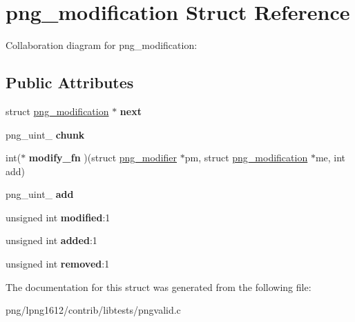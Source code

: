 \hypertarget{structpng__modification}{\section{png\+\_\+modification Struct Reference}
\label{structpng__modification}
}


Collaboration diagram for png\+\_\+modification\+:
\subsection*{Public Attributes}
\begin{DoxyCompactItemize}
\item 
\hypertarget{structpng__modification_ac0a124aec5b95e2fe45bd06455ddaec8}{struct \hyperlink{structpng__modification}{png\+\_\+modification} $\ast$ {\bfseries next}}\label{structpng__modification_ac0a124aec5b95e2fe45bd06455ddaec8}

\item 
\hypertarget{structpng__modification_a92a54182117f247799335db88923e007}{png\+\_\+uint\+\_ {\bfseries chunk}}\label{structpng__modification_a92a54182117f247799335db88923e007}

\item 
\hypertarget{structpng__modification_a8fe99df292f4749e6e8510a350918889}{int($\ast$ {\bfseries modify\+\_\+fn} )(struct \hyperlink{structpng__modifier}{png\+\_\+modifier} $\ast$pm, struct \hyperlink{structpng__modification}{png\+\_\+modification} $\ast$me, int add)}\label{structpng__modification_a8fe99df292f4749e6e8510a350918889}

\item 
\hypertarget{structpng__modification_ac1490a5c4d3dda207c71b9210e0797df}{png\+\_\+uint\+\_ {\bfseries add}}\label{structpng__modification_ac1490a5c4d3dda207c71b9210e0797df}

\item 
\hypertarget{structpng__modification_a5dc6c0d3ffcfeed1e67f234313864dfe}{unsigned int {\bfseries modified}\+:1}\label{structpng__modification_a5dc6c0d3ffcfeed1e67f234313864dfe}

\item 
\hypertarget{structpng__modification_a215f0decea098fa137e4e14097d0f1ff}{unsigned int {\bfseries added}\+:1}\label{structpng__modification_a215f0decea098fa137e4e14097d0f1ff}

\item 
\hypertarget{structpng__modification_a88599f576cd0432c428db7d852871a99}{unsigned int {\bfseries removed}\+:1}\label{structpng__modification_a88599f576cd0432c428db7d852871a99}

\end{DoxyCompactItemize}


The documentation for this struct was generated from the following file\+:\begin{DoxyCompactItemize}
\item 
png/lpng1612/contrib/libtests/pngvalid.\+c\end{DoxyCompactItemize}

